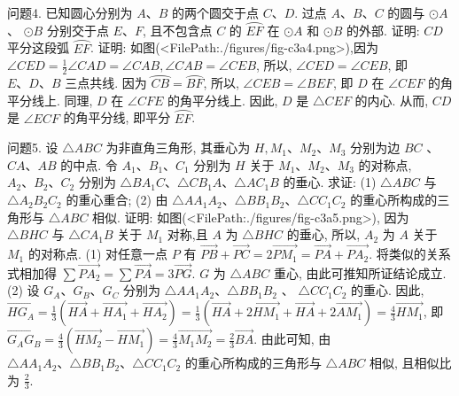 问题4. 已知圆心分别为 $A 、 B$ 的两个圆交于点 $C 、 D$. 过点 $A 、 B 、 C$ 的圆与 $\odot A$ 、 $\odot B$ 分别交于点 $E 、 F$, 且不包含点 $C$ 的 $\overparen{E F}$ 在 $\odot A$ 和 $\odot B$ 的外部.
证明: $C D$ 平分这段弧 $\overparen{E F}$.
证明: 如图(<FilePath:./figures/fig-c3a4.png>),因为 $\angle C E D=\frac{1}{2} \angle C A D= \angle C A B, \angle C A B=\angle C E B$, 所以, $\angle C E D= \angle C E B$, 即 $E 、 D 、 B$ 三点共线.
因为 $\overparen{C B}=\overparen{B F}$, 所以, $\angle C E B=\angle B E F$, 即 $D$ 在 $\angle C E F$ 的角平分线上.
同理, $D$ 在 $\angle C F E$ 的角平分线上.
因此, $D$ 是 $\triangle C E F$ 的内心.
从而, $C D$ 是
$\angle E C F$ 的角平分线, 即平分 $\overparen{E F}$.



问题5. 设 $\triangle A B C$ 为非直角三角形, 其垂心为 $H, M_1 、 M_2 、 M_3$ 分别为边 $B C$ 、 $C A 、 A B$ 的中点.
令 $A_1 、 B_1 、 C_1$ 分别为 $H$ 关于 $M_1 、 M_2 、 M_3$ 的对称点, $A_2 、 B_2 、 C_2$ 分别为 $\triangle B A_1 C 、 \triangle C B_1 A 、 \triangle A C_1 B$ 的垂心.
求证: (1) $\triangle A B C$ 与 $\triangle A_2 B_2 C_2$ 的重心重合; (2) 由 $\triangle A A_1 A_2 、 \triangle B B_1 B_2 、 \triangle C C_1 C_2$ 的重心所构成的三角形与 $\triangle A B C$ 相似.
证明: 如图(<FilePath:./figures/fig-c3a5.png>), 因为 $\triangle B H C$ 与 $\triangle C A_1 B$ 关于 $M_1$ 对称,且 $A$ 为 $\triangle B H C$ 的垂心, 所以, $A_2$ 为 $A$ 关于 $M_1$ 的对称点.
(1) 对任意一点 $P$ 有 $\overrightarrow{P B}+\overrightarrow{P C}=2 \overrightarrow{P M_1}=\overrightarrow{P A}+ \overrightarrow{P A_2}$. 将类似的关系式相加得 $\sum \overrightarrow{P A_2}=\sum \overrightarrow{P A}= 3 \overrightarrow{P G}$. $G$ 为 $\triangle A B C$ 重心, 由此可推知所证结论成立.
(2) 设 $G_A 、 G_B 、 G_C$ 分别为 $\triangle A A_1 A_2 、 \triangle B B_1 B_2$ 、 $\triangle C C_1 C_2$ 的重心.
因此, $\overrightarrow{H G_A}=\frac{1}{3}\left(\overrightarrow{H A}+\overrightarrow{H A_1}+\right.\left.\overrightarrow{H A_2}\right)=\frac{1}{3}\left(\overrightarrow{H A}+2 \overrightarrow{H M_1}+\overrightarrow{H A}+2 \overrightarrow{A M_1}\right)=\frac{4}{3} \overrightarrow{H M_1}$, 即 $\overrightarrow{G_A G_B}=\frac{4}{3}\left(\overrightarrow{H M_2}-\right. \left.\overrightarrow{H M_1}\right)=\frac{4}{3} \overrightarrow{M_1 M_2}=\frac{2}{3} \overrightarrow{B A}$. 由此可知, 由 $\triangle A A_1 A_2 、 \triangle B B_1 B_2 、 \triangle C C_1 C_2$ 的重心所构成的三角形与 $\triangle A B C$ 相似, 且相似比为 $\frac{2}{3}$.




